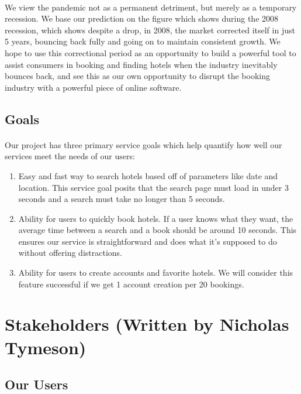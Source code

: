 \documentclass[]{article}
\begin{document}
\paragraph{}
We view the pandemic not as a permanent detriment, but merely as a temporary recession. We base our prediction on the figure which shows during the 2008 recession, which shows despite a drop, in 2008, the market corrected itself in just 5 years, bouncing back fully and going on to maintain consistent growth. We hope to use this correctional period as an opportunity to build a powerful tool to assist consumers in booking and finding hotels when the industry inevitably bounces back, and see this as our own opportunity to disrupt the booking industry with a powerful piece of online software. 

\subsection{Goals}
\paragraph{}
Our project has three primary service goals which help quantify how well our services meet the needs of our users:
\begin{enumerate}
    \item Easy and fast way to search hotels based off of parameters like date and location. This service goal posits that the search page must load in under 3 seconds and a search must take no longer than 5 seconds. 
    \item Ability for users to quickly book hotels. If a user knows what they want, the average time between a search and a book should be around 10 seconds. This ensures our service is straightforward and does what it's supposed to do without offering distractions.
    \item Ability for users to create accounts and favorite hotels. We will consider this feature successful if we get 1 account creation per 20 bookings. 
\end{enumerate}

\section{Stakeholders (Written by Nicholas Tymeson)}
\subsection{Our Users}
\end{document}
